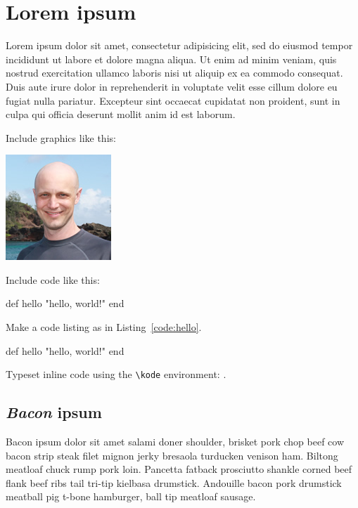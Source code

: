 \chapter{Lorem ipsum}
\label{cha:lorem_ipsum}

Lorem ipsum dolor sit amet, consectetur adipisicing elit, sed do eiusmod
tempor incididunt ut labore et dolore magna aliqua. Ut enim ad minim veniam,
quis nostrud exercitation ullamco laboris nisi ut aliquip ex ea commodo
consequat. Duis aute irure dolor in reprehenderit in voluptate velit esse
cillum dolore eu fugiat nulla pariatur. Excepteur sint occaecat cupidatat non
proident, sunt in culpa qui officia deserunt mollit anim id est laborum.

Include graphics like this:

\includegraphics{images/2011_michael_hartl.png}

Include code like this:

\begin{code}
def hello
  "hello, world!"
end
\end{code}

Make a code listing as in Listing~\ref{code:hello}.

\begin{codelisting}
\label{code:hello}
\begin{code}
def hello
  "hello, world!"
end
\end{code}
\end{codelisting}

Typeset inline code using the \verb+\kode+ environment: .

\section{\emph{Bacon} ipsum}
\label{sec:bacon_ipsum}

Bacon ipsum dolor sit amet salami doner shoulder, brisket pork chop beef cow bacon strip steak filet mignon jerky bresaola turducken venison ham. Biltong meatloaf chuck rump pork loin. Pancetta fatback prosciutto shankle corned beef flank beef ribs tail tri-tip kielbasa drumstick. Andouille bacon pork drumstick meatball pig t-bone hamburger, ball tip meatloaf sausage.

